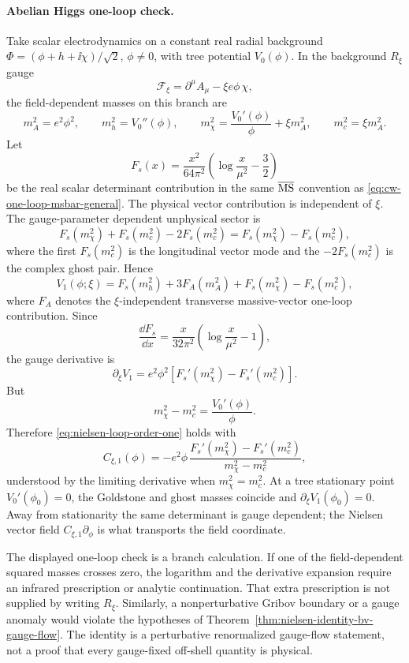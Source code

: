 \paragraph{Abelian Higgs one-loop check.}
Take scalar electrodynamics on a constant real radial background
\(\Phi=(\phi+h+\ii\chi)/\sqrt2\), \(\phi\ne0\), with tree potential
\(V_0(\phi)\).  In the background \(R_\xi\) gauge
\[
  \mathcal F_\xi=\partial^\mu A_\mu-\xi e\phi\,\chi ,
\]
the field-dependent masses on this branch are
\[
  m_A^2=e^2\phi^2,\qquad
  m_h^2=V_0''(\phi),\qquad
  m_\chi^2=\frac{V_0'(\phi)}{\phi}+\xi m_A^2,\qquad
  m_c^2=\xi m_A^2 .
\]
Let
\[
  F_s(x)=\frac{x^2}{64\pi^2}
  \left(\log\frac{x}{\mu^2}-\frac32\right)
\]
be the real scalar determinant contribution in the same
\(\overline{\rm MS}\) convention as
\eqref{eq:cw-one-loop-msbar-general}.  The physical vector contribution is
independent of \(\xi\).  The gauge-parameter dependent unphysical sector is
\[
  F_s(m_\chi^2)+F_s(m_c^2)-2F_s(m_c^2)
  =
  F_s(m_\chi^2)-F_s(m_c^2),
\]
where the first \(F_s(m_c^2)\) is the longitudinal vector mode and the
\(-2F_s(m_c^2)\) is the complex ghost pair.  Hence
\begin{equation}
  V_1(\phi;\xi)
  =
  F_s(m_h^2)+3F_A(m_A^2)
  +F_s(m_\chi^2)-F_s(m_c^2),
  \label{eq:nielsen-abelian-higgs-one-loop}
\end{equation}
where \(F_A\) denotes the \(\xi\)-independent transverse massive-vector
one-loop contribution.  Since
\[
  \frac{\dd F_s}{\dd x}
  =
  \frac{x}{32\pi^2}
  \left(\log\frac{x}{\mu^2}-1\right),
\]
the gauge derivative is
\[
  \partial_\xi V_1
  =
  e^2\phi^2
  \left[
    F_s'(m_\chi^2)-F_s'(m_c^2)
  \right].
\]
But
\[
  m_\chi^2-m_c^2=\frac{V_0'(\phi)}{\phi}.
\]
Therefore \eqref{eq:nielsen-loop-order-one} holds with
\begin{equation}
  C_{\xi,1}(\phi)
  =
  -e^2\phi\,
  \frac{F_s'(m_\chi^2)-F_s'(m_c^2)}
       {m_\chi^2-m_c^2},
  \label{eq:nielsen-abelian-higgs-c1}
\end{equation}
understood by the limiting derivative when \(m_\chi^2=m_c^2\).  At a tree
stationary point \(V_0'(\phi_0)=0\), the Goldstone and ghost masses coincide
and \(\partial_\xi V_1(\phi_0)=0\).  Away from stationarity the same
determinant is gauge dependent; the Nielsen vector field
\(C_{\xi,1}\partial_\phi\) is what transports the field coordinate.

\begin{remark}
The displayed one-loop check is a branch calculation.  If one of the
field-dependent squared masses crosses zero, the logarithm and the derivative
expansion require an infrared prescription or analytic continuation.  That
extra prescription is not supplied by writing \(R_\xi\).  Similarly, a
nonperturbative Gribov boundary or a gauge anomaly would violate the
hypotheses of Theorem~\ref{thm:nielsen-identity-bv-gauge-flow}.  The identity
is a perturbative renormalized gauge-flow statement, not a proof that every
gauge-fixed off-shell quantity is physical.
\end{remark}

